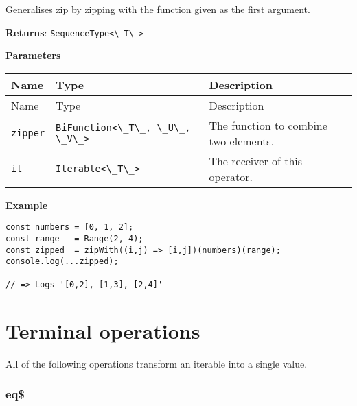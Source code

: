 Generalises zip by zipping with the function given as the first
argument.

\textbf{Returns}: \passthrough{\lstinline!SequenceType<\_T\_>!}

\textbf{Parameters}

\begin{longtable}[]{
  >{\raggedright\arraybackslash}p{}
  >{\raggedright\arraybackslash}p{}
  >{\raggedright\arraybackslash}p{}@{}}

\toprule\noalign{}
Name & Type & Description \\
\midrule\noalign{}
\endfirsthead
\toprule\noalign{}
Name & Type & Description \\
\midrule\noalign{}
\endhead
\bottomrule\noalign{}
\endlastfoot
\passthrough{\lstinline!zipper!} &
\passthrough{\lstinline!BiFunction<\_T\_, \_U\_, \_V\_>!} & The function
to combine two elements. \\
\passthrough{\lstinline!it!} & \passthrough{\lstinline!Iterable<\_T\_>!}
& The receiver of this operator. \\
\end{longtable}

\textbf{Example}

\begin{lstlisting}[label=bcceae38-355f-4d33-9233-3c55fcda81d9]
const numbers = [0, 1, 2];
const range   = Range(2, 4);
const zipped  = zipWith((i,j) => [i,j])(numbers)(range);
console.log(...zipped);
                                                        
// => Logs '[0,2], [1,3], [2,4]'
\end{lstlisting}

\hypertarget{fe5771c4-997c-4878-97c6-42d757c1418a}{%
\section{Terminal
operations}\label{fe5771c4-997c-4878-97c6-42d757c1418a}}

All of the following operations transform an iterable into a single
value.

\hypertarget{bd20be56-f445-48bf-bdf2-a716e1236a4d}{%
\subsubsection{eq\$}\label{bd20be56-f445-48bf-bdf2-a716e1236a4d}}

